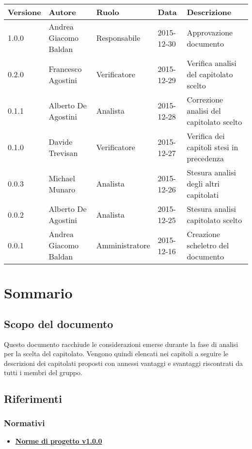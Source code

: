 \documentclass{scalatekids-article}
\begin{document}
\begin{center}
  \begin{tabular}{| l | l | l | l | l |}
    \hline
    Versione & Autore & Ruolo & Data & Descrizione \\
    \hline
    1.0.0 & Andrea Giacomo Baldan & Responsabile & 2015-12-30 & Approvazione documento\\
    \hline
    0.2.0 & Francesco Agostini & Verificatore & 2015-12-29 & Verifica analisi del capitolato scelto\\
    \hline
    0.1.1 & Alberto De Agostini & Analista & 2015-12-28 & Correzione analisi del capitolato scelto\\
    \hline
    0.1.0 & Davide Trevisan & Verificatore & 2015-12-27 & Verifica dei capitoli stesi in precedenza\\
    \hline
    0.0.3 & Michael Munaro & Analista & 2015-12-26 & Stesura analisi degli altri capitolati\\
    \hline
    0.0.2 & Alberto De Agostini & Analista & 2015-12-25 & Stesura analisi capitolato scelto\\
    \hline
    0.0.1 & Andrea Giacomo Baldan & Amministratore & 2015-12-16 & Creazione scheletro del documento\\
    \hline
  \end{tabular}
\end{center}
\tableofcontents
\section{Sommario}
\subsection{Scopo del documento}
Questo documento racchiude le considerazioni emerse durante la fase di analisi per la scelta del capitolato.
Vengono quindi elencati nei capitoli a seguire le descrizioni dei capitolati proposti con annessi vantaggi e svantaggi riscontrati da tutti i membri del gruppo.
\prodPurpose
\glossExpl
\subsection{Riferimenti}
\subsubsection{Normativi}
\begin{itemize}
\item \href{run:NormeDiProgetto_v0.0.1.tex}{\textbf{Norme di progetto v1.0.0}}
\end{itemize}
\end{document}
